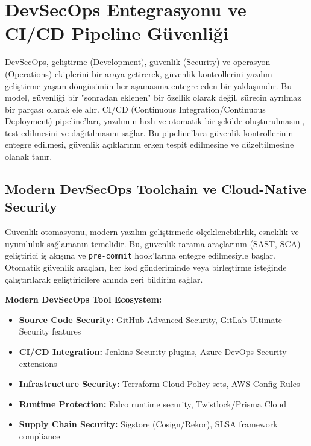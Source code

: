 \section{DevSecOps Entegrasyonu ve CI/CD Pipeline Güvenliği}

DevSecOps, geliştirme (Development), güvenlik (Security) ve operasyon (Operations) ekiplerini bir araya getirerek, güvenlik kontrollerini yazılım geliştirme yaşam döngüsünün her aşamasına entegre eden bir yaklaşımdır. Bu model, güvenliği bir "sonradan eklenen" bir özellik olarak değil, sürecin ayrılmaz bir parçası olarak ele alır. CI/CD (Continuous Integration/Continuous Deployment) pipeline'ları, yazılımın hızlı ve otomatik bir şekilde oluşturulmasını, test edilmesini ve dağıtılmasını sağlar. Bu pipeline'lara güvenlik kontrollerinin entegre edilmesi, güvenlik açıklarının erken tespit edilmesine ve düzeltilmesine olanak tanır.

\subsection{Modern DevSecOps Toolchain ve Cloud-Native Security}

Güvenlik otomasyonu, modern yazılım geliştirmede ölçeklenebilirlik, esneklik ve uyumluluk sağlamanın temelidir. Bu, güvenlik tarama araçlarının (SAST, SCA) geliştirici iş akışına ve \texttt{pre-commit} hook'larına entegre edilmesiyle başlar. Otomatik güvenlik araçları, her kod gönderiminde veya birleştirme isteğinde çalıştırılarak geliştiricilere anında geri bildirim sağlar.

\textbf{Modern DevSecOps Tool Ecosystem:}
\begin{itemize}
    \item \textbf{Source Code Security:} GitHub Advanced Security, GitLab Ultimate Security features
    \item \textbf{CI/CD Integration:} Jenkins Security plugins, Azure DevOps Security extensions
    \item \textbf{Infrastructure Security:} Terraform Cloud Policy sets, AWS Config Rules
    \item \textbf{Runtime Protection:} Falco runtime security, Twistlock/Prisma Cloud
    \item \textbf{Supply Chain Security:} Sigstore (Cosign/Rekor), SLSA framework compliance
\end{itemize}

